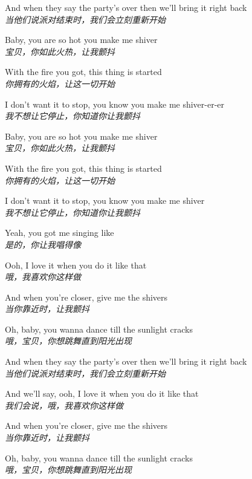 \begin{spacing}{1.5}
\begin{flushleft}
And when they say the party's over then we'll bring it right back\\
\textit{当他们说派对结束时，我们会立刻重新开始}\lyricspace

Baby, you are so hot you make me shiver\\
\textit{宝贝，你如此火热，让我颤抖}\lyricspace

With the fire you got, this thing is started\\
\textit{你拥有的火焰，让这一切开始}\lyricspace

I don't want it to stop, you know you make me shiver-er-er\\
\textit{我不想让它停止，你知道你让我颤抖}\lyricspace

Baby, you are so hot you make me shiver\\
\textit{宝贝，你如此火热，让我颤抖}\lyricspace

With the fire you got, this thing is started\\
\textit{你拥有的火焰，让这一切开始}\lyricspace

I don't want it to stop, you know you make me shiver\\
\textit{我不想让它停止，你知道你让我颤抖}\lyricspace

Yeah, you got me singing like\\
\textit{是的，你让我唱得像}\lyricspace

Ooh, I love it when you do it like that\\
\textit{哦，我喜欢你这样做}\lyricspace

And when you're closer, give me the shivers\\
\textit{当你靠近时，让我颤抖}\lyricspace

Oh, baby, you wanna dance till the sunlight cracks\\
\textit{哦，宝贝，你想跳舞直到阳光出现}\lyricspace

And when they say the party's over then we'll bring it right back\\
\textit{当他们说派对结束时，我们会立刻重新开始}\lyricspace

And we'll say, ooh, I love it when you do it like that\\
\textit{我们会说，哦，我喜欢你这样做}\lyricspace

And when you're closer, give me the shivers\\
\textit{当你靠近时，让我颤抖}\lyricspace

Oh, baby, you wanna dance till the sunlight cracks\\
\textit{哦，宝贝，你想跳舞直到阳光出现}\lyricspace


\end{flushleft}
\end{spacing}
